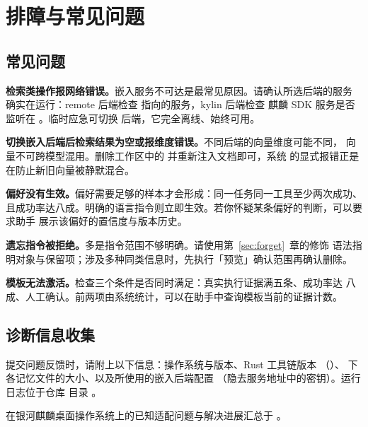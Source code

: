 \section{排障与常见问题}\label{sec:faq}

\subsection{常见问题}

\textbf{检索类操作报网络错误。}嵌入服务不可达是最常见原因。请确认所选后端的服务
确实在运行：remote 后端检查  指向的服务，kylin 后端检查
麒麟 SDK 服务是否监听在 。临时应急可切换
 后端，它完全离线、始终可用。

\textbf{切换嵌入后端后检索结果为空或报维度错误。}不同后端的向量维度可能不同，
向量不可跨模型混用。删除工作区中的  并重新注入文档即可，系统
的显式报错正是在防止新旧向量被静默混合。

\textbf{偏好没有生效。}偏好需要足够的样本才会形成：同一任务同一工具至少两次成功、
且成功率达八成。明确的语言指令则立即生效。若你怀疑某条偏好的判断，可以要求助手
展示该偏好的置信度与版本历史。

\textbf{遗忘指令被拒绝。}多是指令范围不够明确。请使用第~\ref{sec:forget}~章的修饰
语法指明对象与保留项；涉及多种同类信息时，先执行「预览」确认范围再确认删除。

\textbf{模板无法激活。}检查三个条件是否同时满足：真实执行证据满五条、成功率达
八成、人工确认。前两项由系统统计，可以在助手中查询模板当前的证据计数。

\subsection{诊断信息收集}

提交问题反馈时，请附上以下信息：操作系统与版本、Rust 工具链版本
（）、 下各记忆文件的大小、以及所使用的嵌入后端配置
（隐去服务地址中的密钥）。运行日志位于仓库  目录 。

在银河麒麟桌面操作系统上的已知适配问题与解决进展汇总于
。
